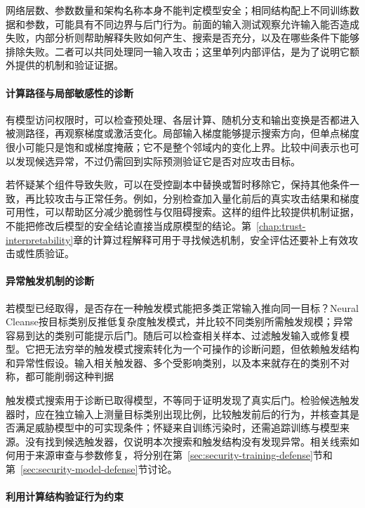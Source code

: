 网络层数、参数数量和架构名称本身不能判定模型安全；相同结构配上不同训练数据和参数，可能具有不同边界与后门行为。前面的输入测试观察允许输入能否造成失败，内部分析则帮助解释失败如何产生、搜索是否充分，以及在哪些条件下能够排除失败。二者可以共同处理同一输入攻击；这里单列内部评估，是为了说明它额外提供的机制和验证证据。

\paragraph{计算路径与局部敏感性的诊断}

有模型访问权限时，可以检查预处理、各层计算、随机分支和输出变换是否都进入被测路径，再观察梯度或激活变化。局部输入梯度能够提示搜索方向，但单点梯度很小可能只是饱和或梯度掩蔽；它不是整个邻域内的变化上界。比较中间表示也可以发现候选异常，不过仍需回到实际预测验证它是否对应攻击目标。

若怀疑某个组件导致失败，可以在受控副本中替换或暂时移除它，保持其他条件一致，再比较攻击与正常任务。例如，分别检查加入量化前后的真实攻击结果和梯度可用性，可以帮助区分减少脆弱性与仅阻碍搜索。这样的组件比较提供机制证据，不能把修改后模型的安全结论直接当成原模型的结论。第~\ref{chap:trust-interpretability}章的计算过程解释可用于寻找候选机制，安全评估还要补上有效攻击或性质验证。

\paragraph{异常触发机制的诊断}

若模型已经取得，是否存在一种触发模式能把多类正常输入推向同一目标？Neural Cleanse按目标类别反推低复杂度触发模式，并比较不同类别所需触发规模；异常容易到达的类别可能提示后门。随后可以检查相关样本、过滤触发输入或修复模型。它把无法穷举的触发模式搜索转化为一个可操作的诊断问题，但依赖触发结构和异常性假设。输入相关触发器、多个受影响类别，以及本来就存在的类别不对称，都可能削弱这种判据

触发模式搜索用于诊断已取得模型，不等同于证明发现了真实后门。检验候选触发器时，应在独立输入上测量目标类别出现比例，比较触发前后的行为，并核查其是否满足威胁模型中的可实现条件；怀疑来自训练污染时，还需追踪训练与模型来源。没有找到候选触发器，仅说明本次搜索和触发结构没有发现异常。相关线索如何用于来源审查与参数修复，将分别在第~\ref{sec:security-training-defense}节和第~\ref{sec:security-model-defense}节讨论。

\paragraph{利用计算结构验证行为约束}

